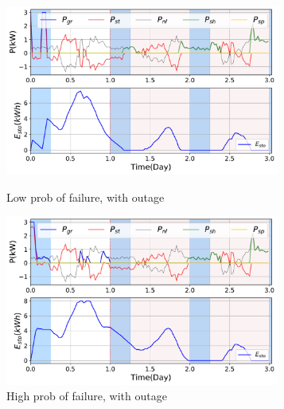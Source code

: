 \documentclass{ifacconf}
\begin{document}
\begin{figure}[!ht]
    \noindent  
    \begin{minipage}{.49\linewidth}
        \raggedleft
        \includegraphics[height=2.2in,width=1\linewidth]{Figures/Mc_LowFailYesOut.pdf}
        \caption{Low prob of failure, with outage}
        \label{fig:LOwFailYesOut}    
    \end{minipage}%
    \begin{minipage}{.02\linewidth}
      \hspace{1px}
    \end{minipage}%
    \begin{minipage}{0.49\linewidth}
        \raggedright
        \includegraphics[height=2.2in,width=1\columnwidth]{Figures/Mc_HighFailYesOut.pdf} 
        \caption{High prob of failure, with outage}
        \label{fig:HighFailYesOut}
    \end{minipage}
\end{figure}


 
\end{document}
